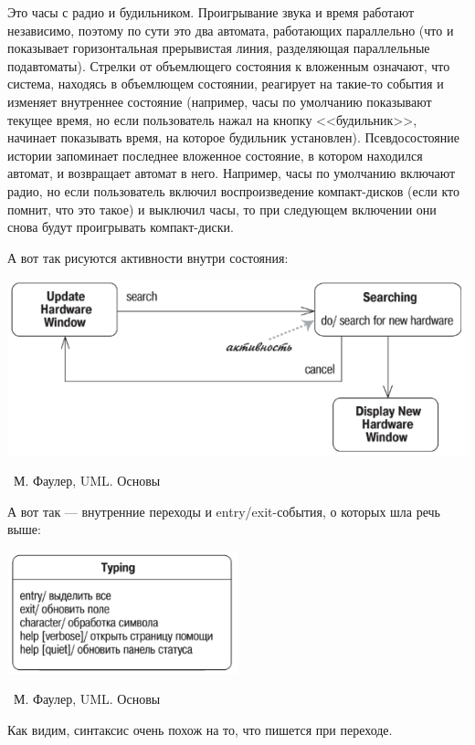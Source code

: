\documentclass[a5paper]{article}
\newcommand{\attribution}[1] {
	\vspace{-5mm}\begin{flushright}\begin{scriptsize}%
	{\textcopyright\, #1}\end{scriptsize}\end{flushright}
}
\begin{document}
Это часы с радио и будильником. Проигрывание звука и время работают независимо, поэтому по сути это два автомата, работающих параллельно (что и показывает горизонтальная прерывистая линия, разделяющая параллельные подавтоматы). Стрелки от объемлющего состояния к вложенным означают, что система, находясь в объемлющем состоянии, реагирует на такие-то события и изменяет внутреннее состояние (например, часы по умолчанию показывают текущее время, но если пользователь нажал на кнопку <<будильник>>, начинает показывать время, на которое будильник установлен). Псевдосостояние истории запоминает последнее вложенное состояние, в котором находился автомат, и возвращает автомат в него. Например, часы по умолчанию включают радио, но если пользователь включил воспроизведение компакт-дисков (если кто помнит, что это такое) и выключил часы, то при следующем включении они снова будут проигрывать компакт-диски.

А вот так рисуются активности внутри состояния:

\begin{center}
	\includegraphics[width=\textwidth]{stateTransitionInternalEventExample.png}
	\attribution{М. Фаулер, UML. Основы}
\end{center}

А вот так --- внутренние переходы и entry/exit-события, о которых шла речь выше:

\begin{center}
	\includegraphics[width=0.5\textwidth]{stateTransitionInternalEvents.png}
	\attribution{М. Фаулер, UML. Основы}
\end{center}

Как видим, синтаксис очень похож на то, что пишется при переходе.
\end{document}
